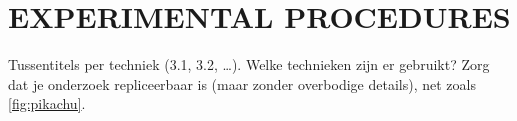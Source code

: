 \section{EXPERIMENTAL PROCEDURES}
Tussentitels per techniek (3.1, 3.2, \dots).
Welke technieken zijn er gebruikt?
Zorg dat je onderzoek repliceerbaar is (maar zonder overbodige details), net zoals \cref{fig:pikachu}.

